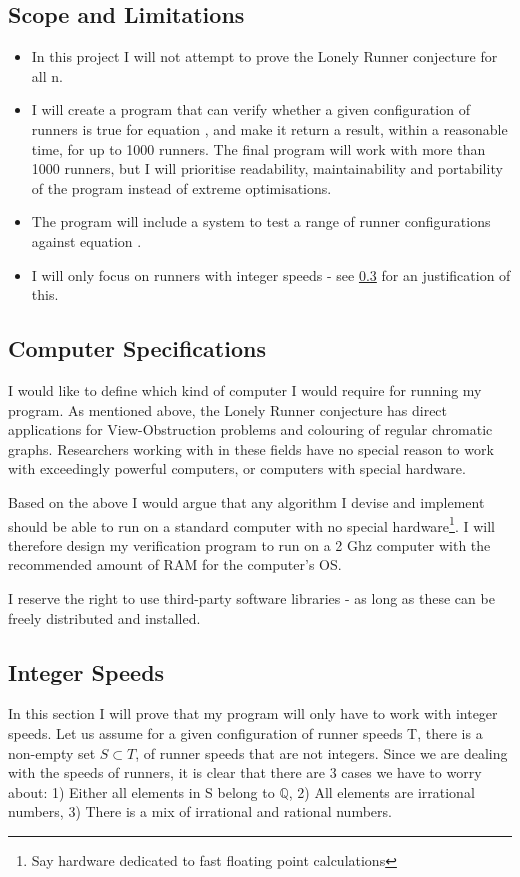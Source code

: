 \subsection{Scope and Limitations}
\begin{itemize}
\item In this project I will not attempt to prove the Lonely Runner conjecture for all n. 
\item I will create a program that can verify whether a given configuration of runners is true for equation , and make it return a result, within a reasonable time, for up to 1000 runners. The final program will work with more than 1000 runners, but I will prioritise readability, maintainability and portability of the program instead of extreme optimisations. 
\item The program will include a system to test a range of runner configurations against equation .
\item I will only focus on runners with integer speeds - see \ref{integerSpeeds} for an justification of this.
\end{itemize}

\subsection{Computer Specifications}
\label{specs}
I would like to define which kind of computer I would require for running my program. As mentioned above, the Lonely Runner conjecture has direct applications for View-Obstruction problems and colouring of regular chromatic graphs. Researchers working with in these fields have no special reason to work with exceedingly powerful computers, or computers with special hardware.
 
Based on the above I would argue that any algorithm I devise and implement should be able to run on a standard computer with no special hardware\footnote{Say hardware dedicated to fast floating point calculations}. I will therefore design my verification program to run on a 2 Ghz computer with the recommended amount of RAM for the computer's OS. 

I reserve the right to use third-party software libraries - as long as these can be freely distributed and installed.

\subsection{Integer Speeds}
\label{integerSpeeds}
In this section I will prove that my program will only have to work with integer speeds.
Let us assume for a given configuration of runner speeds T, there is a non-empty set $S \subset T$, of runner speeds that are not integers. Since we are dealing with the speeds of runners, it is clear that there are 3 cases we have to worry about: 1) Either all elements in S belong to $\mathbb{Q}$, 2) All elements are irrational numbers, 3) There is a mix of irrational and rational numbers.

